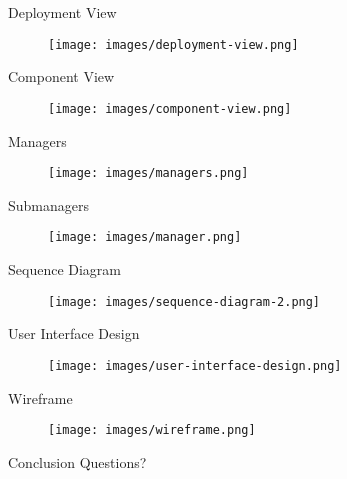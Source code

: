 \documentclass{beamer}
\begin{document}
\begin{frame}{Deployment View}
\begin{figure}
    \centering
    \texttt{[image: images/deployment-view.png]}
\end{figure}
\end{frame}

\begin{frame}{Component View}
\begin{figure}
    \centering
    \texttt{[image: images/component-view.png]}
\end{figure}
\end{frame}

\begin{frame}{Managers}
\begin{figure}
    \centering
    \texttt{[image: images/managers.png]}
\end{figure}
\end{frame}

\begin{frame}{Submanagers}
\begin{figure}
    \centering
    \texttt{[image: images/manager.png]}
\end{figure}
\end{frame}

\begin{frame}{Sequence Diagram}
\begin{figure}
    \centering
    \texttt{[image: images/sequence-diagram-2.png]}
\end{figure}
\end{frame}

\begin{frame}{User Interface Design}
\begin{figure}
    \centering
    \texttt{[image: images/user-interface-design.png]}
\end{figure}
\end{frame}

\begin{frame}{Wireframe}
\begin{figure}
    \centering
    \texttt{[image: images/wireframe.png]}
\end{figure}
\end{frame}

\begin{frame}{Conclusion}
\centering \huge
Questions?
\end{frame}
\end{document}
